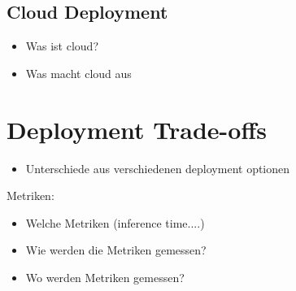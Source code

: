 \subsection{Cloud Deployment}
\begin{itemize}
    \item Was ist cloud?
    \item Was macht cloud aus
\end{itemize}
\section{Deployment Trade-offs}
\begin{itemize}
    \item Unterschiede aus verschiedenen deployment optionen
\end{itemize}
Metriken:
\begin{itemize}
    \item Welche Metriken (inference time....)
    \item Wie werden die Metriken gemessen?
    \item Wo werden Metriken gemessen?
\end{itemize}

\endinput 